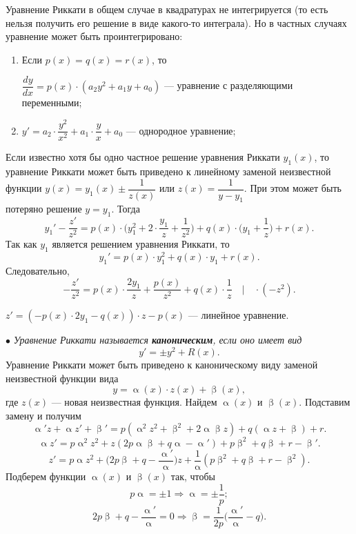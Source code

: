\documentclass[a4paper, 12pt]{report}
\renewcommand{\alpha}{\upalpha}
\renewcommand{\beta}{\upbeta}
\begin{document}
Уравнение Риккати в общем случае в квадратурах не интегрируется (то есть нельзя получить его решение в виде какого-то интеграла). Но в частных случаях уравнение может быть проинтегрировано:
\begin{enumerate}
	\item Если $p(x) = q(x) = r(x)$, то \begin{center}
		$\dfrac{dy}{dx} = p(x)\cdot (a_2y^2 +a_1y + a_0)$ --- уравнение с разделяющими переменными;
	\end{center} 
\item \begin{center}
	$y' = a_2\cdot \dfrac{y^2}{x^2} +a_1\cdot \dfrac{y}{x} + a_0$ --- однородное уравнение;
\end{center}
\end{enumerate}
Если известно хотя бы одно частное решение уравнения Риккати $y_1(x)$, то уравнение Риккати может быть приведено к линейному заменой неизвестной функции $y(x) = y_1(x) \pm \dfrac{1}{z(x)}$ или $z(x) = \dfrac{1}{y - y_1}$. При этом может быть потеряно решение $y = y_1$. Тогда $$y_1' - \dfrac{z'}{z^2} = p(x)\cdot \Big(y_1^2 + 2\cdot\dfrac{y_1}{z} + \dfrac{1}{z^2}\Big) + q(x)\cdot\Big(y_1 + \dfrac{1}{z}\Big) +r(x).$$
Так как $y_1$ является решением уравнения Риккати, то $$y_1' = p(x)\cdot y_1^2 + q(x)\cdot y_1 + r(x).$$
Следовательно, $$-\dfrac{z'}{z^2} = p(x)\cdot \dfrac{2y_1}{z} + \dfrac{p(x)}{z^2} + q(x)\cdot \dfrac{1}{z} \quad \Big|\quad \cdot (-z^2).$$
\begin{center}
	$z' = (-p(x)\cdot 2 y_1 - q(x))\cdot z - p(x)$ --- линейное уравнение.
\end{center}
$\bullet$ \textit{Уравнение Риккати называется \textbf{каноническим}, если оно имеет вид} $$y' = \pm y^2 + R(x).$$
Уравнение Риккати может быть приведено к каноническому виду заменой неизвестной функции вида $$y = \alpha (x)\cdot z (x) + \beta (x),$$
где $z(x)$ --- новая неизвестная функция. Найдем $\alpha(x)$ и $\beta (x)$. Подставим замену и получим
$$\alpha ' z + \alpha z' + \beta' = p(\alpha ^2 z^2 + \beta ^2 + 2\alpha \beta z) + q(\alpha z + \beta ) + r.$$
$$\alpha z' = p\alpha^2z^2 + z(2p\alpha\beta + q\alpha - \alpha') + p\beta^2 + q\beta + r - \beta'.$$
$$z' = p\alpha z^2 + \Big(2p\beta + q - \dfrac{\alpha '}{\alpha }\Big)z + \dfrac{1}{\alpha} (p\beta^2 + q\beta + r - \beta ^2).$$
Подберем функции $\alpha(x)$ и $\beta (x)$ так, чтобы $$p\alpha = \pm 1\Rightarrow \alpha = \pm \dfrac{1}{p};$$
$$2p\beta + q -\dfrac{\alpha '}{\alpha } = 0\Rightarrow\beta = \dfrac{1}{2p}\Big(\dfrac{\alpha '}{\alpha} - q\Big).$$
\end{document}
